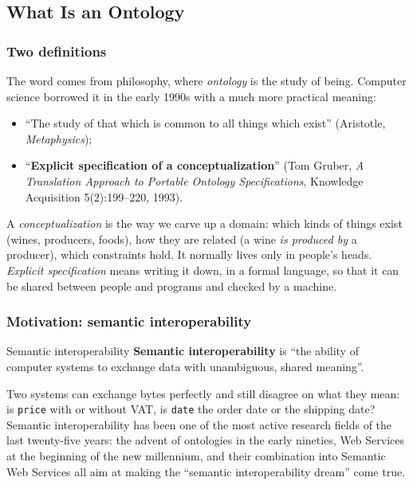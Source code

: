 \subsection{What Is an Ontology}
\label{sec:what-is-an-ontology}

\subsubsection{Two definitions}

The word comes from philosophy, where \emph{ontology} is the study of being. Computer
science borrowed it in the early 1990s with a much more practical meaning:
\begin{itemize}[nosep]
  \item ``The study of that which is common to all things which exist''
        (Aristotle, \emph{Metaphysics});
  \item ``\textbf{Explicit specification of a conceptualization}'' (Tom Gruber,
        \emph{A Translation Approach to Portable Ontology Specifications}, Knowledge
        Acquisition 5(2):199--220, 1993).
\end{itemize}

\begin{nbintuition}
A \emph{conceptualization} is the way we carve up a domain: which kinds of things exist
(wines, producers, foods), how they are related (a wine \emph{is produced by} a
producer), which constraints hold. It normally lives only in people's heads.
\emph{Explicit specification} means writing it down, in a formal language, so that it
can be shared between people and programs and checked by a machine.
\end{nbintuition}

\subsubsection{Motivation: semantic interoperability}

\begin{nbdef}{Semantic interoperability}
\textbf{Semantic interoperability} is ``the ability of computer systems to exchange data
with unambiguous, shared meaning''.
\end{nbdef}

Two systems can exchange bytes perfectly and still disagree on what they mean: is
\texttt{price} with or without VAT, is \texttt{date} the order date or the shipping
date? Semantic interoperability has been one of the most active research fields of the
last twenty-five years: the advent of ontologies in the early nineties, Web Services at
the beginning of the new millennium, and their combination into Semantic Web Services
all aim at making the ``semantic interoperability dream'' come true.


